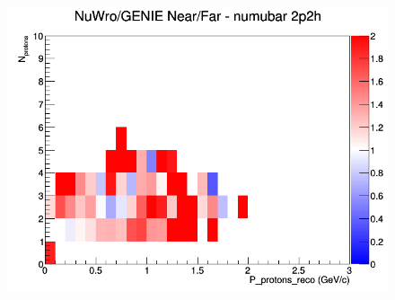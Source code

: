 \begin{figure}[h]
\endminipage
{}
\includegraphics[width=\linewidth]{eff_N_P/FGT/protons/ratios/2p2h_NuWro_GENIE_numubar_NF_N_P.png}
\endminipage
\newline
\end{figure}
\clearpage
